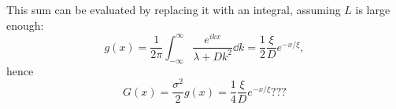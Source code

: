  This sum can be evaluated by replacing it with an integral, assuming $L$ is large enough:
 \begin{equation}
   \label{eq:G_as_integral}
   g(x) = \frac{1}{2\pi}\int_{-\infty}^{\infty}  \frac{e^{ikx}}{\lambda + Dk^2} \dd{k} = \frac{1}{2} \frac{\xi}{D} e^{-x/\xi},
 \end{equation}
 hence
 \begin{equation}
   \label{eq:G_from_G}
   G(x) = \frac{\sigma^2}{2}g(x) =  \frac{1}{4} \frac{\xi}{D} e^{-x/\xi}???
 \end{equation}